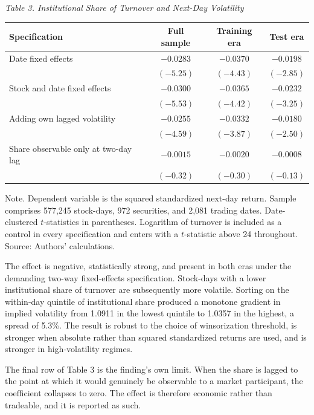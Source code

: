 \documentclass[12pt]{article}
\begin{document}
\begin{table}[htbp]
\centering
\emph{Table 3. Institutional Share of Turnover and Next-Day Volatility}
\vspace{0.3\baselineskip}
\begin{singlespace}
\begin{tabular}{lccc}
\toprule
Specification & Full sample & Training era & Test era \\
\midrule
Date fixed effects & $-0.0283$ & $-0.0370$ & $-0.0198$ \\
 & $(-5.25)$ & $(-4.43)$ & $(-2.85)$ \\
Stock and date fixed effects & $-0.0300$ & $-0.0365$ & $-0.0232$ \\
 & $(-5.53)$ & $(-4.42)$ & $(-3.25)$ \\
Adding own lagged volatility & $-0.0255$ & $-0.0332$ & $-0.0180$ \\
 & $(-4.59)$ & $(-3.87)$ & $(-2.50)$ \\
Share observable only at two-day lag & $-0.0015$ & $-0.0020$ & $-0.0008$ \\
 & $(-0.32)$ & $(-0.30)$ & $(-0.13)$ \\
\bottomrule
\end{tabular}
\end{singlespace}
\vspace{0.3\baselineskip}
\begin{singlespace}
\RaggedRight
Note. Dependent variable is the squared standardized next-day
return. Sample comprises 577,245 stock-days, 972 securities, and 2,081 trading
dates. Date-clustered $t$-statistics in parentheses. Logarithm of turnover is
included as a control in every specification and enters with a $t$-statistic
above 24 throughout. Source: Authors' calculations.
\end{singlespace}
\end{table}

The effect is negative, statistically strong, and present in both eras under
the demanding two-way fixed-effects specification. Stock-days with a lower
institutional share of turnover are subsequently more volatile. Sorting on the
within-day quintile of institutional share produced a monotone gradient in
implied volatility from 1.0911 in the lowest quintile to 1.0357 in the
highest, a spread of 5.3\%. The result is robust to the choice of
winsorization threshold, is stronger when absolute rather than squared
standardized returns are used, and is stronger in high-volatility regimes.

The final row of Table 3 is the finding's own limit. When the share is lagged
to the point at which it would genuinely be observable to a market
participant, the coefficient collapses to zero. The effect is therefore
economic rather than tradeable, and it is reported as such.
\end{document}
